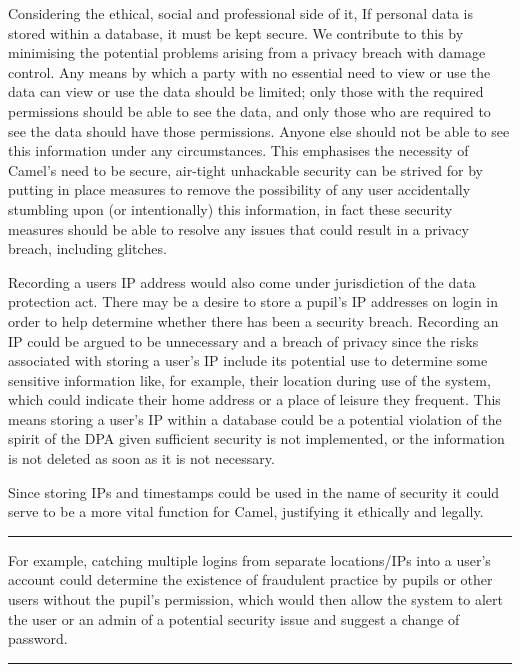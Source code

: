     Considering the ethical, social and professional side of it, If personal data is stored within a database, it must be kept secure. We contribute to this by minimising the potential problems arising from a privacy breach with damage control. Any means by which a party with no essential need to view or use the data can view or use the data should be limited; only those with the required permissions should be able to see the data, and only those who are required to see the data should have those permissions. Anyone else should not be able to see this information under any circumstances. This emphasises the necessity of Camel’s need to be secure, air-tight unhackable security can be strived for by putting in place measures to remove the possibility of any user accidentally stumbling upon (or intentionally) this information, in fact these security measures should be able to resolve any issues that could result in a privacy breach, including glitches.

Recording a users IP address would also come under jurisdiction of the data protection act. There may be a desire to store a pupil's IP addresses on login in order to help determine whether there has been a security breach. Recording an IP could be argued to be unnecessary and a breach of privacy since the risks associated with storing a user’s IP include its potential use to determine some sensitive information like, for example, their location during use of the system, which could indicate their home address or a place of leisure they frequent. This means storing a user’s IP within a database could be a potential violation of the spirit of the DPA given sufficient security is not implemented, or the information is not deleted as soon as it is not necessary.

Since storing IPs and timestamps could be used in the name of security it could serve to be a more vital function for Camel, justifying it ethically and legally.

\vspace{0.2cm}
\hrule
\begin{flushright}
\scriptsize For example, catching multiple logins from separate locations/IPs into a user’s account could determine the existence of fraudulent practice by pupils or other users without the pupil’s permission, which would then allow the system to alert the user or an admin of a potential security issue and suggest a change of password.
\end{flushright}
\hrule
\vspace{0.2cm}

